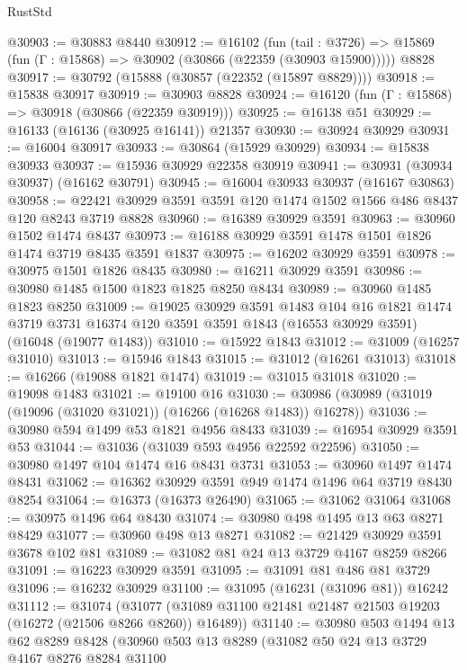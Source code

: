 \begin{lexlean}{RustStd}
\begin{coremodule}
@30903 := @30883 @8440
@30912 := @16102
    (fun (tail : @3726) => @15869 (fun (Γ : @15868) => @30902 (@30866 (@22359 (@30903 @15900)))))
    @8828
@30917 := @30792 (@15888 (@30857 (@22352 (@15897 @8829))))
@30918 := @15838 @30917
@30919 := @30903 @8828
@30924 := @16120 (fun (Γ : @15868) => @30918 (@30866 (@22359 @30919)))
@30925 := @16138 @51
@30929 := @16133 (@16136 (@30925 @16141)) @21357
@30930 := @30924 @30929
@30931 := @16004 @30917
@30933 := @30864 (@15929 @30929)
@30934 := @15838 @30933
@30937 := @15936 @30929 @22358 @30919
@30941 := @30931 (@30934 @30937) (@16162 @30791)
@30945 := @16004 @30933 @30937 (@16167 @30863)
@30958 := @22421 @30929 @3591 @3591 @120 @1474 @1502 @1566 @486 @8437 @120 @8243 @3719 @8828
@30960 := @16389 @30929 @3591
@30963 := @30960 @1502 @1474 @8437
@30973 := @16188 @30929 @3591 @1478 @1501 @1826 @1474 @3719 @8435 @3591 @1837
@30975 := @16202 @30929 @3591
@30978 := @30975 @1501 @1826 @8435
@30980 := @16211 @30929 @3591
@30986 := @30980 @1485 @1500 @1823 @1825 @8250 @8434
@30989 := @30960 @1485 @1823 @8250
@31009 := @19025
    @30929
    @3591
    @1483
    @104
    @16
    @1821
    @1474
    @3719
    @3731
    @16374
    @120
    @3591
    @3591
    @1843
    (@16553 @30929 @3591)
    (@16048 (@19077 @1483))
@31010 := @15922 @1843
@31012 := @31009 (@16257 @31010)
@31013 := @15946 @1843
@31015 := @31012 (@16261 @31013)
@31018 := @16266 (@19088 @1821 @1474)
@31019 := @31015 @31018
@31020 := @19098 @1483
@31021 := @19100 @16
@31030 := @30986 (@30989 (@31019 (@19096 (@31020 @31021)) (@16266 (@16268 @1483)) @16278))
@31036 := @30980 @594 @1499 @53 @1821 @4956 @8433
@31039 := @16954 @30929 @3591 @53
@31044 := @31036 (@31039 @593 @4956 @22592 @22596)
@31050 := @30980 @1497 @104 @1474 @16 @8431 @3731
@31053 := @30960 @1497 @1474 @8431
@31062 := @16362 @30929 @3591 @949 @1474 @1496 @64 @3719 @8430 @8254
@31064 := @16373 (@16373 @26490)
@31065 := @31062 @31064
@31068 := @30975 @1496 @64 @8430
@31074 := @30980 @498 @1495 @13 @63 @8271 @8429
@31077 := @30960 @498 @13 @8271
@31082 := @21429 @30929 @3591 @3678 @102 @81
@31089 := @31082 @81 @24 @13 @3729 @4167 @8259 @8266
@31091 := @16223 @30929 @3591
@31095 := @31091 @81 @486 @81 @3729
@31096 := @16232 @30929
@31100 := @31095 (@16231 (@31096 @81)) @16242
@31112 := @31074
    (@31077 (@31089 @31100 @21481 @21487 @21503 @19203 (@16272 (@21506 @8266 @8260)) @16489))
@31140 := @30980
    @503
    @1494
    @13
    @62
    @8289
    @8428
    (@30960
      @503
      @13
      @8289
      (@31082
        @50
        @24
        @13
        @3729
        @4167
        @8276
        @8284
        @31100

\end{coremodule}
\end{lexlean}
